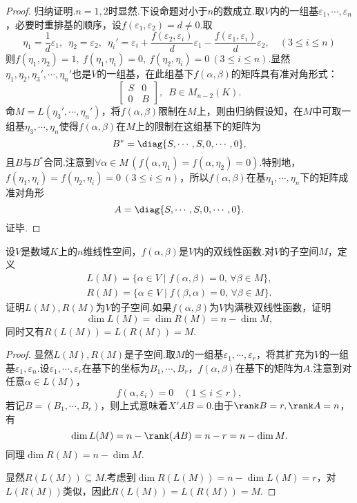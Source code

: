 \begin{proof}
	归纳证明.$n=1,2$时显然.下设命题对小于$n$的数成立.取$V$内的一组基$\varepsilon_1,\cdots,\varepsilon_n$，必要时重排基的顺序，设$f(\varepsilon_1,\varepsilon_2)=d\ne0$.取
	\[
		\eta_1=\frac{1}{d}\varepsilon_1,\enspace\eta_2=\varepsilon_2,\enspace\eta_i'=\varepsilon_i+\frac{f(\varepsilon_2,\varepsilon_i)}{d}\varepsilon_1-\frac{f(\varepsilon_1,\varepsilon_i)}{d}\varepsilon_2,\quad(3\le i\le n)
	\]
	则$f(\eta_1,\eta_2)=1,\ f(\eta_1,\eta_i)=0,\ f(\eta_2,\eta_i)=0\ (3\le i\le n)$.显然$\eta_1,\eta_2,\eta_3',\cdots,\eta_n'$也是$V$的一组基，在此组基下$f(\alpha,\beta)$的矩阵具有准对角形式：
	\[
		\begin{bmatrix}
			S & 0 \\
			0 & B
		\end{bmatrix},\enspace B\in M_{n-2}(K).
	\]
	命$M=L(\eta_3',\cdots,\eta_n')$，将$f(\alpha,\beta)$限制在$M$上，则由归纳假设知，在$M$中可取一组基$\eta_3,\cdots,\eta_n$使得$f(\alpha,\beta)$在$M$上的限制在这组基下的矩阵为
	\[
		B^*=\diag{S,\cdots,S,0,\cdots,0},
	\]
	且$B$与$B^*$合同.注意到$\forall \alpha\in M\,(f(\alpha,\eta_1)=f(\alpha,\eta_2)=0)$.特别地，$f(\eta_1,\eta_i)=f(\eta_2,\eta_i)=0\ (3\le i\le n)$，所以$f(\alpha,\beta)$在基$\eta_1,\cdots,\eta_n$下的矩阵成准对角形
	\[
		A=\diag{S,\cdots,S,0,\cdots,0}.
	\]
	证毕.
\end{proof}
\begin{prob}[18]
	设$V$是数域$K$上的$n$维线性空间，$f(\alpha,\beta)$是$V$内的双线性函数.对$V$的子空间$M$，定义
	\begin{gather*}
		L(M)=\{\alpha\in V\mid f(\alpha,\beta)=0,\,\forall \beta\in M\},\\
		R(M)=\{\alpha\in V\mid f(\beta,\alpha)=0,\,\forall \beta\in M\}.
	\end{gather*}
	证明$L(M),R(M)$为$V$的子空间.如果$f(\alpha,\beta)$为$V$内满秩双线性函数，证明
	\[
		\dim L(M)=\dim R(M)=n-\dim M,
	\]
	同时又有$R(L(M))=L(R(M))=M$.
\end{prob}
\begin{proof}
	显然$L(M),R(M)$是子空间.取$M$的一组基$\varepsilon_1,\cdots,\varepsilon_r$，将其扩充为$V$的一组基$\varepsilon_1,\varepsilon_n$.设$\varepsilon_1,\cdots,\varepsilon_r$在基下的坐标为$B_1,\cdots,B_r$，$f(\alpha,\beta)$在基下的矩阵为$A$.注意到对任意$\alpha\in L(M)$，
	\[
		f(\alpha,\varepsilon_i)=0\quad(1\le i\le r),
	\]
	若记$B=(B_1,\cdots,B_r)$，则上式意味着$X'AB=0$.由于$\rank B=r,\rank A=n$，有
	\[
		\dim L(M)=n-\rank(AB)=n-r=n-\dim M.
	\]
	同理$\dim R(M)=n-\dim M$.

	显然$R(L(M))\subseteq M$.考虑到$\dim R(L(M))=n-\dim L(M)=r$，对$L(R(M))$类似，因此$R(L(M))=L(R(M))=M$.
\end{proof}
